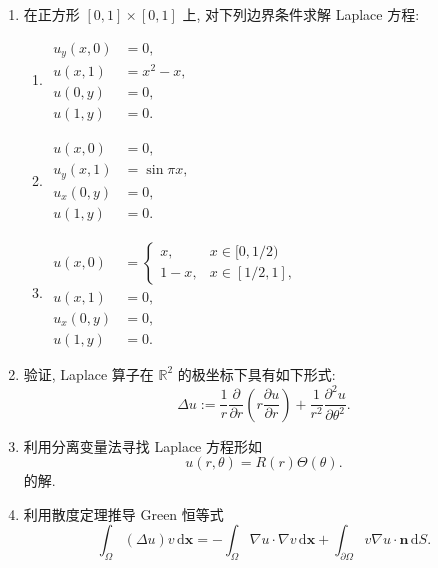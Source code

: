 \begin{enumerate}[label=\thesection.\arabic*.,ref=\thesection.\arabic*,start=12,series=book-problems]
\item\label{ex:square-mixed-boundary-problems} 在正方形 $[0,1]\times[0,1]$ 上, 对下列边界条件求解 Laplace 方程:\begin{enumerate}[label=(\alph*)]
\item $\begin{aligned}
u_y(x,0)&=0,\\u(x,1)&=x^2-x,\\u(0,y)&=0,\\u(1,y)&=0.
\end{aligned}$
\item $\begin{aligned}
u(x,0)&=0,\\u_y(x,1)&=\sin\pi x,\\u_x(0,y)&=0,\\u(1,y)&=0.
\end{aligned}$
\item $\begin{aligned}
u(x,0)&=\begin{cases}x,&x\in[0,1/2)\\1-x,&x\in[1/2,1],\end{cases}\\
u(x,1)&=0,\\u_x(0,y)&=0,\\u(1,y)&=0.
\end{aligned}$
\end{enumerate}

\item\label{ex:laplacian-polar-coordinates} 验证, Laplace 算子在 $\mathbb{R}^2$ 的极坐标下具有如下形式:
\[
\Delta u:=\dfrac1r\dfrac{\partial}{\partial r}\left(r\dfrac{\partial u}{\partial r}\right)+\dfrac1{r^2}\dfrac{\partial^2u}{\partial\theta^2}.
\]


\item\label{ex:polar-separated-solutions} 利用分离变量法寻找 Laplace 方程形如
\[
u(r,\theta)=R(r)\Theta(\theta).
\]
的解.

\item\label{ex:derive-green-identity} 利用散度定理推导 Green 恒等式
\[
\int_\Omega(\Delta u)v\,\mathrm{d}\bm{x}=-\int_\Omega\nabla u\cdot\nabla v\,\mathrm{d}\bm{x}+\int_{\partial\Omega}v\nabla u\cdot\bm{n}\,\mathrm{d}S.
\]


\end{enumerate}
